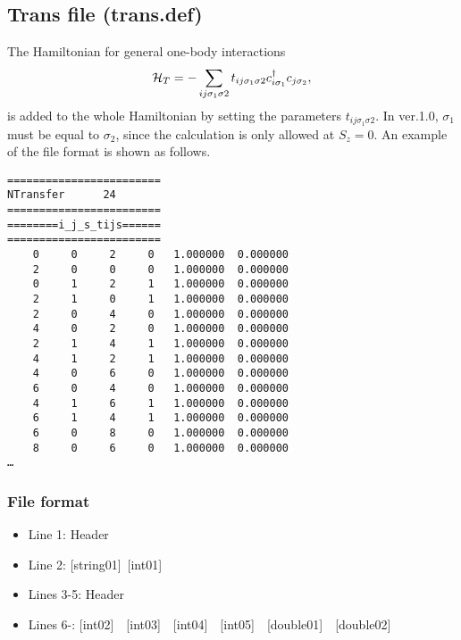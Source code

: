\newpage
\subsection{Trans file (trans.def)}
\label{Subsec:Trans}
The Hamiltonian for general one-body interactions 
\begin{align}
{\cal H}_{T} =-\sum_{ij\sigma_1\sigma2} t_{ij\sigma_1\sigma2}c_{i\sigma_1}^{\dag}c_{j\sigma_2},
\end{align}
is added to the whole Hamiltonian by setting the parameters $t_{ij\sigma_1\sigma2}$. 
In ver.1.0, $\sigma_1$ must be equal to $\sigma_2$, since the calculation is only allowed at $S_z=0$.
An example of the file format is shown as follows.\\
\begin{minipage}{12.5cm}
\begin{screen}
\begin{verbatim}
======================== 
NTransfer      24  
======================== 
========i_j_s_tijs====== 
======================== 
    0     0     2     0   1.000000  0.000000
    2     0     0     0   1.000000  0.000000
    0     1     2     1   1.000000  0.000000
    2     1     0     1   1.000000  0.000000
    2     0     4     0   1.000000  0.000000
    4     0     2     0   1.000000  0.000000
    2     1     4     1   1.000000  0.000000
    4     1     2     1   1.000000  0.000000
    4     0     6     0   1.000000  0.000000
    6     0     4     0   1.000000  0.000000
    4     1     6     1   1.000000  0.000000
    6     1     4     1   1.000000  0.000000
    6     0     8     0   1.000000  0.000000
    8     0     6     0   1.000000  0.000000
…
\end{verbatim}
\end{screen}
\end{minipage}

\subsubsection{File format}
\begin{itemize}
   \item  Line 1:  Header
   \item  Line 2:   [string01]~[int01]
   \item  Lines 3-5:  Header
   \item  Lines 6-: [int02]~~[int03]~~[int04]~~[int05]~~[double01]~~[double02] 
  \end{itemize}
